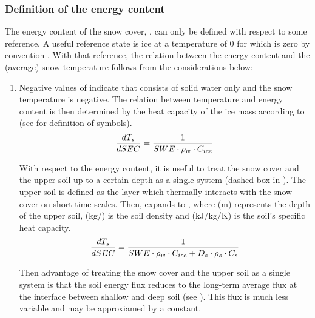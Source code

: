 \subsubsection{Definition of the energy content} \label{sec:snow-enBal_energy-content}
The energy content of the snow cover, \snowEnergyContent, can only be defined with respect to some reference. A useful reference state is ice at a temperature of 0\celsius{} for which \snowEnergyContent{} is zero by convention \citep{Tarboton1996}. With that reference, the relation between the energy content \snowEnergyContent{} and the (average) snow temperature \snowTemperature{} follows from the considerations below:

\begin{enumerate}

  \item Negative values of \snowEnergyContent{} indicate that \snowWaterEquivalent{} consists of solid water only and the snow temperature is negative. The relation between temperature and energy content is then determined by the heat capacity of the ice mass according to  (see  for definition of symbols).
  \begin{equation} \label{eqn:snow-enBal_heating-of-ice}
    \frac{dT_s}{dSEC} = \frac{1}{SWE \cdot \rho_{w} \cdot C_{ice}}
  \end{equation}

  With respect to the energy content, it is useful to treat the snow cover and the upper soil up to a certain depth \soilInteractionDepth{} as a single system (dashed box in ). The upper soil is defined as the layer which thermally interacts with the snow cover on short time scales. Then,  expands to , where \soilInteractionDepth{} (m) represents the depth of the upper soil, \densitySoil{} (kg/\cbm) is the soil density and \specHeatSoil{} (kJ/kg/K) is the soil's specific heat capacity.
  \begin{equation} \label{eqn:snow-enBal_heating-of-ice-soil-system}
    \frac{dT_s}{dSEC} = \frac{1}{SWE \cdot \rho_{w} \cdot C_{ice} + D_s \cdot \rho_s \cdot C_s}
  \end{equation}

  Then advantage of treating the snow cover and the upper soil as a single system is that the soil energy flux reduces to the long-term average flux at the interface between shallow and deep soil (see ). This flux is much less variable and may be approxiamed by a constant.


\end{enumerate}

